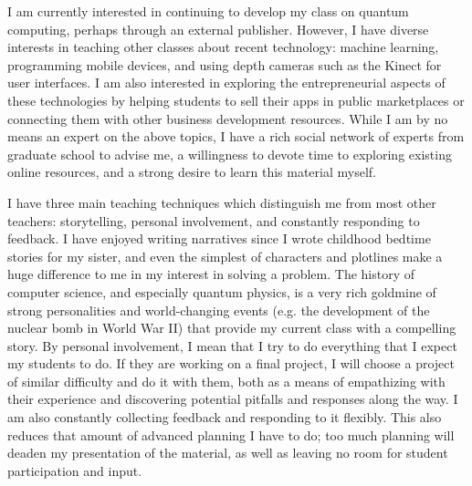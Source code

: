 \documentclass{article}
\begin{document}
I am currently interested in continuing to develop
my class on quantum computing, perhaps through an external publisher.
However, I have diverse interests in teaching
other classes about recent technology: machine learning, programming
mobile devices, and using depth cameras such as the Kinect for user interfaces.
I am also interested in exploring the entrepreneurial aspects of these
technologies by helping students to sell their apps in public marketplaces or
connecting them with other business development resources.
While I am by no means an expert on the above topics, I have a
rich social network of experts from graduate school to advise me, a willingness
to devote time to exploring existing online resources, and a strong
desire to learn this material myself.

I have three main teaching techniques which distinguish me from most other
teachers: storytelling, personal involvement, and constantly responding to feedback.
I have enjoyed writing narratives since I wrote childhood bedtime stories for my
sister, and even the simplest of characters and plotlines make a huge difference
to me in my interest in solving a problem. The history of computer
science, and especially quantum physics, is a very rich goldmine of strong
personalities and world-changing events (e.g. the development of the
nuclear bomb in World War II) that provide my current class with a compelling
story. By personal involvement, I mean that I try to do everything that I expect
my students to do. If they are working on a final project, I will choose a
project of similar difficulty and do it with them, both as a means of empathizing
with their experience and discovering potential pitfalls and responses along the
way. I am also constantly collecting feedback and responding to it flexibly.
This also reduces that amount of advanced planning I have to do; too much
planning will deaden my presentation of the material, as well as leaving no
room for student participation and input.

\end{document}
